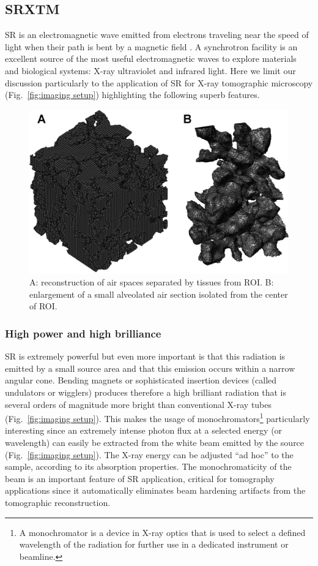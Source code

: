 \subsection{SRXTM}
\ac{SR} is an electromagnetic wave emitted from electrons traveling near the speed of light when their path is bent by a magnetic field \cite{Iida2003}. A synchrotron facility is an excellent source of the most useful electromagnetic waves to explore materials and biological systems: X-ray ultraviolet and infrared light. Here we limit our discussion particularly to the application of \ac{SR} for X-ray tomographic microscopy (Fig.~\ref{fig:imaging setup}) highlighting the following superb features.

\begin{figure}[htb]
	\centering
	\includegraphics[width=\imsize]{img/Tsuda2008/Tsuda-09}
	\caption[Three-dimensional reconstruction of air spaces]{A: reconstruction of \threed air spaces separated by tissues from \ac{ROI}. B: enlargement of a small alveolated air section isolated from the center of \ac{ROI}.}
	\label{fig:3dalveolated}
\end{figure}

\subsubsection{High power and high brilliance}
\ac{SR} is extremely powerful but even more important is that this radiation is emitted by a small source area and that this emission occurs within a narrow angular cone. Bending magnets or sophisticated insertion devices (called undulators or wigglers) produces therefore a high brilliant radiation that is several orders of magnitude more bright than conventional X-ray tubes (Fig.~\ref{fig:imaging setup}). This makes the usage of monochromators\footnote{A monochromator is a device in X-ray optics that is used to select a defined wavelength of the radiation for further use in a dedicated instrument or beamline.} particularly interesting since an extremely intense photon flux at a selected energy (or wavelength) can easily be extracted from the white beam emitted by the source (Fig.~\ref{fig:imaging setup}). The X-ray energy can be adjusted ``ad hoc'' to the sample, according to its absorption properties. The monochromaticity of the beam is an important feature of \ac{SR} application, critical for tomography applications since it automatically eliminates beam hardening artifacts from the tomographic reconstruction.

